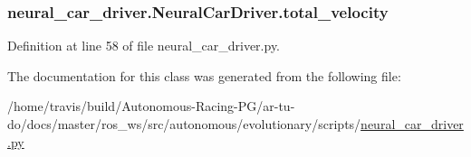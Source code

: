 \subsubsection[{\texorpdfstring{total\+\_\+velocity}{total_velocity}}]{\setlength{\rightskip}{0pt plus 5cm}neural\+\_\+car\+\_\+driver.\+Neural\+Car\+Driver.\+total\+\_\+velocity}\hypertarget{classneural__car__driver_1_1_neural_car_driver_a0d1f352fc537723d9ba1048317b56942}{}\label{classneural__car__driver_1_1_neural_car_driver_a0d1f352fc537723d9ba1048317b56942}


Definition at line 58 of file neural\+\_\+car\+\_\+driver.\+py.



The documentation for this class was generated from the following file\+:\begin{DoxyCompactItemize}
\item 
/home/travis/build/\+Autonomous-\/\+Racing-\/\+P\+G/ar-\/tu-\/do/docs/master/ros\+\_\+ws/src/autonomous/evolutionary/scripts/\hyperlink{neural__car__driver_8py}{neural\+\_\+car\+\_\+driver.\+py}\end{DoxyCompactItemize}

